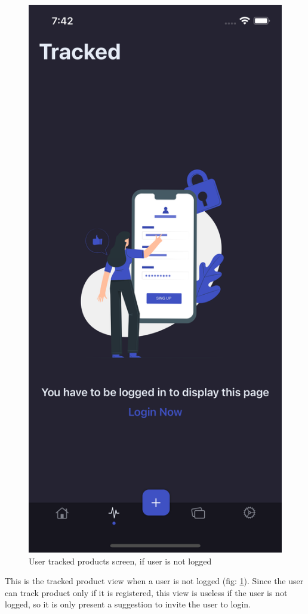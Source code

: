 \begin{figure}[h!]
        \centering
        \includegraphics[scale=0.15]{images/interfaces/user_tracked_screen_not_logged.png}
        \caption{User tracked products screen, if user is not logged}
        \label{fig:user_tracked_screen_not_logged}
\end{figure}
\FloatBarrier
This is the tracked product view when a user is not logged (fig: \ref{fig:user_tracked_screen_not_logged}). Since the user can track product only if it is registered, this view is useless if the user is not logged, so it is only present a suggestion to invite the user to login.

